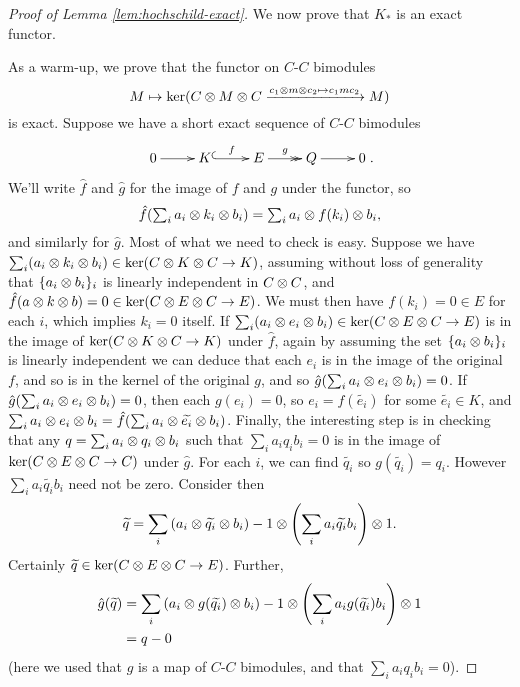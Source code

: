 \begin{proof}[Proof of Lemma \ref{lem:hochschild-exact}]
We now prove that $K_*$ is an exact functor.

As a warm-up, we prove
that the functor on $C$-$C$ bimodules
\begin{equation*}
M \mapsto \ker(C \otimes M \otimes C \xrightarrow{c_1 \otimes m \otimes c_2 \mapsto c_1 m c_2} M)
\end{equation*}
is exact.
Suppose we have a short exact sequence of $C$-$C$ bimodules $$\xymatrix{0 \ar[r] & K \ar@{^{(}->}[r]^f & E \ar@{->>}[r]^g & Q \ar[r] & 0}.$$
We'll write $\hat{f}$ and $\hat{g}$ for the image of $f$ and $g$ under the functor, so 
\[
	\hat{f}(\textstyle\sum_i a_i \otimes k_i \otimes b_i) = 
						\textstyle\sum_i a_i \otimes f(k_i) \otimes b_i ,
\]
and similarly for $\hat{g}$.
Most of what we need to check is easy.
Suppose we have $\sum_i (a_i \otimes k_i \otimes b_i) \in \ker(C \otimes K \otimes C \to K)$, 
assuming without loss of generality that $\{a_i \otimes b_i\}_i$ is linearly independent in $C \otimes C$, 
and $\hat{f}(a \otimes k \otimes b) = 0 \in \ker(C \otimes E \otimes C \to E)$.
We must then have $f(k_i) = 0 \in E$ for each $i$, which implies $k_i=0$ itself. 
If $\sum_i (a_i \otimes e_i \otimes b_i) \in \ker(C \otimes E \otimes C \to E)$ 
is in the image of $\ker(C \otimes K \otimes C \to K)$ under $\hat{f}$, 
again by assuming the set  $\{a_i \otimes b_i\}_i$ is linearly independent we can deduce that each
$e_i$ is in the image of the original $f$, and so is in the kernel of the original $g$, 
and so $\hat{g}(\sum_i a_i \otimes e_i \otimes b_i) = 0$.
If $\hat{g}(\sum_i a_i \otimes e_i \otimes b_i) = 0$, then each $g(e_i) = 0$, so $e_i = f(\widetilde{e_i})$ 
for some $\widetilde{e_i} \in K$, and $\sum_i a_i \otimes e_i \otimes b_i = \hat{f}(\sum_i a_i \otimes \widetilde{e_i} \otimes b_i)$.
Finally, the interesting step is in checking that any $q = \sum_i a_i \otimes q_i \otimes b_i$ 
such that $\sum_i a_i q_i b_i = 0$ is in the image of $\ker(C \otimes E \otimes C \to C)$ under $\hat{g}$.
For each $i$, we can find $\widetilde{q_i}$ so $g(\widetilde{q_i}) = q_i$.
However $\sum_i a_i \widetilde{q_i} b_i$ need not be zero.
Consider then $$\widetilde{q} = \sum_i \left(a_i \otimes \widetilde{q_i} \otimes b_i\right) - 1 \otimes \left(\sum_i a_i \widetilde{q_i} b_i\right) \otimes 1.$$ Certainly
$\widetilde{q} \in \ker(C \otimes E \otimes C \to E)$.
Further,
\begin{align*}
\hat{g}(\widetilde{q}) & = \sum_i \left(a_i \otimes g(\widetilde{q_i}) \otimes b_i\right) - 1 \otimes \left(\sum_i a_i g(\widetilde{q_i}) b_i\right) \otimes 1 \\
                       & = q - 0
\end{align*}
(here we used that $g$ is a map of $C$-$C$ bimodules, and that $\sum_i a_i q_i b_i = 0$).


\end{proof}
